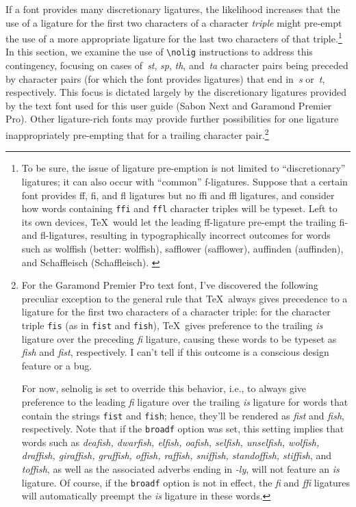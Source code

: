 \documentclass[11pt]{article}
\newcommand{\pkg}[1]{\textsf{#1}}
\newcommand{\opt}[1]{\texttt{#1}}
\newcommand{\cmmd}[1]{\texttt{\textbackslash #1}}
\begin{document}
If a font provides many discretionary ligatures, the likelihood increases that the use of a ligature for the first two characters of a character \emph{triple} might pre-empt the use of a more appropriate ligature for the last two characters of that triple.\footnote{To be sure, the issue of ligature pre-emption is not limited to \enquote{discretionary} ligatures; it can also occur with \enquote{common} f-ligatures. Suppose that a certain font provides ff, fi, and fl ligatures but no ffi and ffl ligatures, and consider how words containing \opt{ffi} and \opt{ffl} character triples will be typeset. Left to its own devices, \TeX\ would let the leading ff-ligature pre-empt the trailing fi- and fl-ligatures, resulting in typographically incorrect outcomes for words such as wol\mbox{ff}ish (better: wolf\mbox{fi}sh), sa\mbox{ff}lower (safflower), au\mbox{ff}inden (auffinden), and Scha\mbox{ff}leisch (Schaffleisch). \label{fn:triple}} 
In this section, we examine the use of \cmmd{nolig} instructions to address this contingency, focusing on cases of~\emph{st}, \emph{sp}, \emph{th}, and~\emph{ta} character pairs being preceded by character pairs (for which the font provides ligatures) that end in~\emph{s} or~\emph{t}, respectively. This focus is dictated largely by the discretionary ligatures provided by the text font used for this user guide (Sabon Next and Garamond Premier Pro). Other ligature-rich fonts may provide further possibilities for one ligature inappropriately pre-empting that for a trailing character pair.\footnote{For the Garamond Premier Pro text font, I've discovered the following preculiar exception to the general rule that \TeX\ always gives precedence to a ligature for the first two characters of a character triple: for the character triple \opt{fis} (as in \opt{fist} and \opt{fish}), \TeX\ gives preference to the trailing \emph{is} ligature over the preceding \emph{fi} ligature, causing these words to be typeset as \emph{f\mbox{is}h} and \emph{f\mbox{is}t}, respectively. I can't tell if this outcome is a conscious design feature or a bug.

For now, \pkg{selnolig} is set to override this behavior, i.e., to always give preference to the leading \emph{fi} ligature over the trailing \emph{is} ligature for words that contain the strings \opt{fist} and \opt{fish}; hence, they'll be rendered as \emph{fist} and \emph{fish}, respectively. Note that if the \opt{broadf} option was set, this setting implies that words such as {\em deafish, dwarfish, elfish, oafish, selfish, unselfish, wolfish, draffish, giraffish, gruffish, offish, raffish, sniffish, standoffish, stiffish}, and \emph{toffish}, as well as the associated adverbs ending in \emph{-ly}, will not feature an \emph{is} ligature. Of course, if the \opt{broadf} option is not in effect, the \emph{fi} and \emph{ffi} ligatures will automatically preempt the \emph{is} ligature in these words.}
\end{document}
